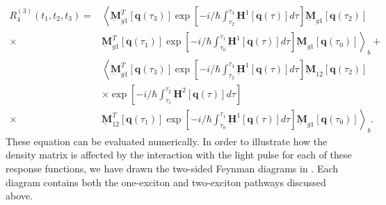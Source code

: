 \documentclass{article}
\newcommand{\vect}[1]{\ensuremath{\boldsymbol{\mathbf{#1}}}}
\begin{document}
\begin{equation}
\begin{split}
 R_{4}^{(3)}(t_{1},t_{2},t_{3})=&\left\langle\underbar{\vect{M}}_{g1}^{T}[\vect q(\tau_{3})]\exp\left[-i/\hbar\int_{\tau_{2}}^{\tau_{3}}\underbar{\vect{H}}^{1}[\vect q(\tau)]d\tau\right] \underbar{\vect{M}}_{g1} [\vect q(\tau_{2})]\right.\\
			  \times&\left.\underbar{\vect{M}}_{g1}^{T}[\vect q(\tau_{1})]\exp\left[-i/\hbar\int_{\tau_{0}}^{\tau_{1}}\underbar{\vect{H}}^{1}[\vect q(\tau)]d\tau\right] \underbar{\vect{M}}_{g1} [\vect q(\tau_{0})]\right\rangle_{b}+\\
			  &\left\langle\underbar{\vect{M}}_{g1}^{T}[\vect q(\tau_{3})]\exp\left[-i/\hbar\int_{\tau_{2}}^{\tau_{3}}\underbar{\vect{H}}^{1}[\vect q(\tau)]d\tau\right] \underbar{\vect{M}}_{12} [\vect q(\tau_{2})]\right.\\
			  &\times\exp\left[-i/\hbar\int_{\tau_{1}}^{\tau_{2}}\underbar{\vect{H}}^{2}[\vect q(\tau)]d\tau\right]\\
			  \times&\left.\underbar{\vect{M}}_{12}^{T}[\vect q(\tau_{1})]\exp\left[-i/\hbar\int_{\tau_{0}}^{\tau_{1}}\underbar{\vect{H}}^{1}[\vect q(\tau)]d\tau\right] \underbar{\vect{M}}_{g1} [\vect q(\tau_{0})]\right\rangle_{b}.
\end{split}
\end{equation}
These equation can be evaluated numerically. 
In order to illustrate how the density matrix is affected by the interaction with the light pulse for each of these response functions, we have drawn the two-sided Feynman diagrams in .
Each diagram contains both the one-exciton and two-exciton pathways discussed above.
\end{document}
